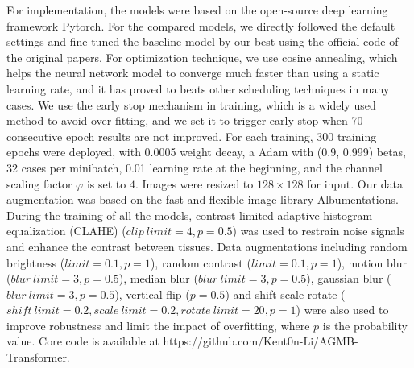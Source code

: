\documentclass[journal]{IEEEtran}
\begin{document}
For implementation, the models were based on the open-source deep learning framework Pytorch\cite{paszke2019pytorch}. For the compared models, we directly followed the default settings and fine-tuned the baseline model by our best using the official code of the original papers. For optimization technique, we use cosine annealing, which helps the neural network model to converge much faster than using a static learning rate, and it has proved to beats other scheduling techniques in many cases. We use the early stop mechanism in training, which is a widely used method to avoid over fitting, and we set it to trigger early stop when 70 consecutive epoch results are not improved. For each training, 300 training epochs were deployed, with 0.0005 weight decay, a Adam\cite{kingma2014adam} with (0.9, 0.999) betas, 32 cases per minibatch, 0.01 learning rate at the beginning, and the channel scaling factor $\varphi$ is set to $4$. Images were resized to $128 \times 128$ for input. Our data augmentation was based on the fast and flexible image library Albumentations\cite{info11020125}. During the training of all the models, contrast limited adaptive histogram equalization (CLAHE)\cite{reza2004realization} ($clip\ limit=4, p=0.5$) was used to restrain noise signals and enhance the contrast between tissues. Data augmentations including random brightness ($limit=0.1, p=1$), random contrast ($limit=0.1, p=1$), motion blur ($blur\ limit=3, p=0.5$), median blur ($blur\ limit=3, p=0.5$), gaussian blur ($blur\ limit=3, p=0.5$), vertical flip ($p=0.5$) and shift scale rotate ($shift\ limit=0.2, scale\ limit=0.2, rotate\ limit=20, p=1$) were also used to improve robustness and limit the impact of overfitting, where $p$ is the probability value. Core code is available at https://github.com/Kent0n-Li/AGMB-Transformer. 
\end{document}
